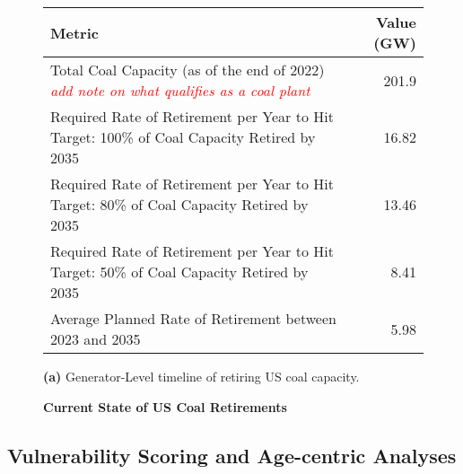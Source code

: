 \begin{figure}[htb]
    \centering
    \begin{minipage}{1\textwidth}
          
    \end{minipage}

    \begin{minipage}{1\textwidth}
    \begin{adjustbox}{width=\textwidth}
        \begin{small}
        \begin{tabular}{|l | r |}
            \hline
            \textbf{Metric} & \textbf{Value (GW)} \\
            \hline\hline
            Total Coal Capacity (as of the end of 2022) \textcolor{red}{\textit{add note on what qualifies as a coal plant}} & 201.9 \\
            \hline
            Required Rate of Retirement per Year to Hit Target: 100\% of Coal Capacity Retired by 2035 & 16.82 \\
            \hline
            Required Rate of Retirement per Year to Hit Target: 80\% of Coal Capacity Retired by 2035 & 13.46 \\
            \hline
            Required Rate of Retirement per Year to Hit Target: 50\% of Coal Capacity Retired by 2035 & 8.41 \\
            \hline
            Average Planned Rate of Retirement between 2023 and 2035 & 5.98 \\
            \hline
        \end{tabular}
    \end{small}
    \end{adjustbox}
    \end{minipage}

    \caption{\textbf{Current State of US Coal Retirements}}
    \medskip
    \footnotesize

    \textbf{(a)} Generator-Level timeline of retiring US coal capacity.

    \label{fig:ret_timeline}
\end{figure}



\subsection{Vulnerability Scoring and Age-centric Analyses}

